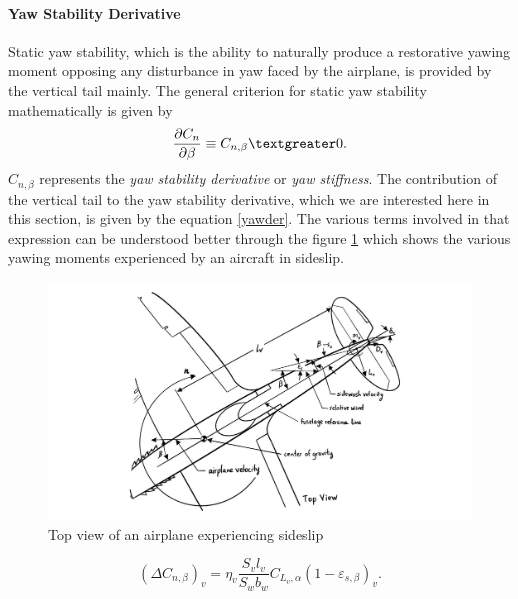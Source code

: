 \documentclass[letterpaper,12pt]{article}
\begin{document}
\paragraph{Yaw Stability Derivative}
Static yaw stability, which is the ability to naturally produce a restorative yawing moment opposing any disturbance in yaw faced by the airplane, is provided by the vertical tail mainly. The general criterion for static yaw stability mathematically is given by
\begin{equation}
\frac{\partial C_n}{\partial\beta}\equiv C_{n,\beta} \textgreater 0.
\end{equation}
$C_{n,\beta}$ represents the \textit{yaw stability derivative} or \textit{yaw stiffness}. The contribution of the vertical tail to the yaw stability derivative, which we are interested here in this section, is given by the equation \ref{yawder}. The various terms involved in that expression can be understood better through the figure \ref{sideslip} which shows the various yawing moments experienced by an aircraft in sideslip.
\begin{figure}[H]
\includegraphics[scale=0.5]{yaw_der}
\centering
\caption{Top view of an airplane experiencing sideslip}
\label{sideslip}
\end{figure}

\vspace{10pt}

\begin{equation}
\boxed{
(\Delta C_{n,\beta})_v=\eta_v\frac{S_vl_v}{S_wb_w}C_{L_v,\alpha}(1-\varepsilon_{s,\beta})_v.
}
\label{yawder}
\end{equation}
\end{document}
